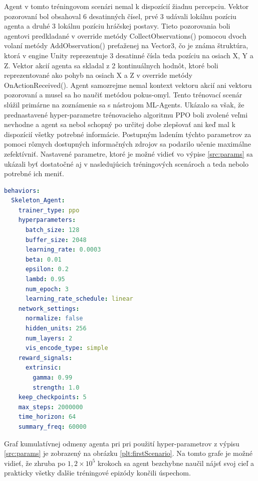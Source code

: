 \documentclass[slovak, master]{diploma}
\begin{document}
Agent v tomto tréningovom scenári nemal k dispozícií žiadnu percepciu. Vektor pozorovaní bol obsahoval 6 desatinných čísel, prvé 3 udávali lokálnu pozíciu agenta a druhé 3 lokálnu pozíciu hráčskej postavy. Tieto pozorovania boli agentovi predkladané v override metódy CollectObservations() pomocou dvoch volaní metódy AddObservation() preťaženej na Vector3, čo je známa štruktúra, ktorá v engine Unity reprezentuje 3 desatinné čísla teda pozíciu na osiach X, Y a Z. Vektor akcií agenta sa skladal z 2 kontinuálnych hodnôt, ktoré boli reprezentované ako pohyb na osiach X a Z v override metódy OnActionReceived(). Agent samozrejme nemal kontext vektoru akcií ani vektoru pozorovaní a musel sa ho naučiť metódou pokus-omyl.
Tento trénovací scenár slúžil primárne na zoznámenie sa s nástrojom ML-Agents. Ukázalo sa však, že prednastavené hyper-parametre trénovacieho algoritmu PPO boli zvolené veľmi nevhodne a agent sa nebol schopný po určitej dobe zlepšovať ani keď mal k dispozícií všetky potrebné informácie. Postupným ladením týchto parametrov za pomoci rôznych dostupných informačných zdrojov sa podarilo učenie maximálne zefektívniť. Nastavené parametre, ktoré je možné vidieť vo výpise \ref{src:params} sa ukázali byť dostatočné aj v nasledujúcich tréningových scenároch a teda nebolo potrebné ich meniť.

\vspace{8pt}
\begin{lstlisting}[language=yml,label=src:params,caption={Hyper-parametre PPO modelu využité pri tréninug NPC agenta Skeleton}]
behaviors:
  Skeleton_Agent:
    trainer_type: ppo
    hyperparameters:
      batch_size: 128
      buffer_size: 2048
      learning_rate: 0.0003
      beta: 0.01
      epsilon: 0.2
      lambd: 0.95
      num_epoch: 3
      learning_rate_schedule: linear
    network_settings:
      normalize: false
      hidden_units: 256
      num_layers: 2
      vis_encode_type: simple
    reward_signals:
      extrinsic:
        gamma: 0.99
        strength: 1.0
    keep_checkpoints: 5
    max_steps: 2000000
    time_horizon: 64
    summary_freq: 60000
\end{lstlisting}

Graf kumulatívnej odmeny agenta pri pri použití hyper-parametrov z výpisu \ref{src:params} je zobrazený na obrázku \ref{plt:firstScenario}. Na tomto grafe je možné vidieť, že zhruba po \(1,2 \times 10^5\) krokoch sa agent bezchybne naučil nájsť svoj cieľ a prakticky všetky ďalšie tréningové epizódy končili úspechom.
\end{document}
